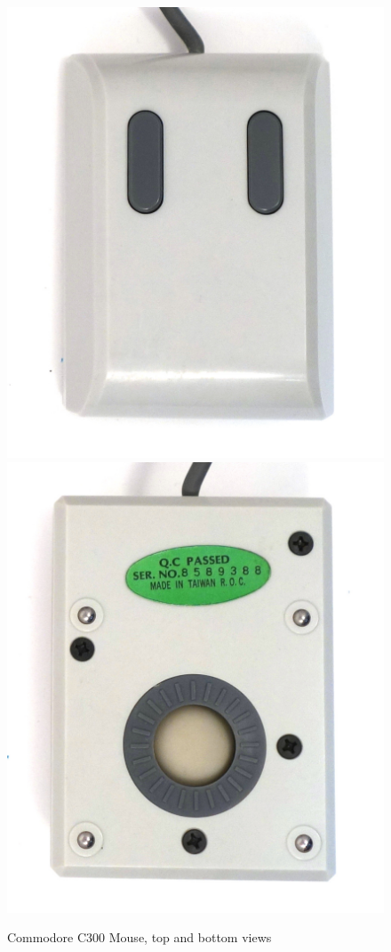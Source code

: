 \documentclass[11pt, a4paper]{article}
\begin{document}
\begin{figure}[h]
    \centering
    \includegraphics[scale=0.7]{1986_commodore_c300_mouse/3verh_60.jpg}
    \includegraphics[scale=0.7]{1986_commodore_c300_mouse/3niz_60.jpg}
    \caption{Commodore C300 Mouse, top and bottom views}
    \label{fig:C300TopAndBottom}
\end{figure}
\end{document}
